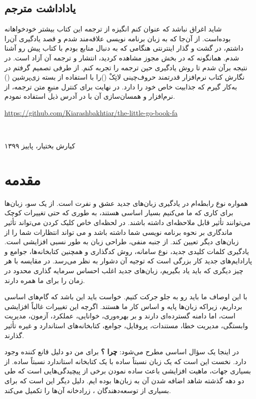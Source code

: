 \documentclass{book}
\begin{document}
\section{یاداداشت مترجم}
شاید اغراق نباشد که عنوان کنم انگیزه از ترجمه این کتاب بیشتر خودخواهانه بوده‌است. از آن‌جا که به زبان برنامه نویسی  علاقه‌مند شدم و قصد یادگیری آن‌را داشتم، در گشت و گذار اینترنتی هنگامی که به دنبال منابع بودم  با کتاب پیش رو آشنا شدم. همانگونه که در بخش مجوز مشاهده کردید، انتشار و ترجمه آن آزاد است. در نتیجه برآن شدم تا روش یادگیری حین ترجمه را تجربه کنم. از طرفی تصمیم گرفتم در نگارش کتاب نرم‌افزار قدرتمند حروف‌چینی لاتِکْ (\lr{\LaTeX})را با استفاده از بسته زی‌پرشین  (\lr{\XePersian}) به‌کار گیرم که جذابیت خاص خود را دارد. در نهایت برای کنترل منبعِ متن ترجمه، از نرم‌افزار  و همسان‌سازی آن با  در آدرس ذیل استفاده نمودم.
\begin{latin}
	\url{https://github.com/Kiarashbakhtiar/the-little-go-book-fa}
\end{latin}
\
\begin{flushleft}
	کیارش بختیار، پاییز ۱۳۹۹
	
\end{flushleft}


\chapter{ مقدمه }%
همواره نوع رابطه‌ام در یادگیری زبان‌های جدید عشق و نفرت است. از یک سو، زبان‌ها برای کاری که ما می‌کنیم بسیار اساسی هستند، به طوری که حتی تغییرات کوچک می‌توانند تأثیر قابل ملاحظه‌ای داشته باشند. در لحظه‌ای خاص کلیک کردن می‌تواند تأثیر ماندگاری بر نحوه برنامه نویسی شما داشته باشد و می تواند انتظارات شما را از زبان‌های دیگر تعیین کند. از جنبه منفی، طراحی زبان به طور نسبی افزایشی است. یادگیری کلمات کلیدی جدید، نوع سامانه، روش کدگذاری و همچنین کتابخانه‌ها، جوامع و پارادایم‌های جدید کار بزرگی است که توجیه آن دشوار به نظر می‌رسد. در مقایسه با هر چیز دیگری که باید یاد بگیریم، زبان‌های جدید اغلب احساس سرمایه گذاری محدود در زمان را برای ما همره دارند. 

با این اوصاف ما باید رو به جلو جرکت کنیم. خواست باید این باشد که گام‌های اساسی برداریم، زیراکه زبان‌ها پایه و اساس کار ما هستند. اگرچه این تغییرات غالباً افزایشی است، اما دامنه گسترده‌ای دارند و بر بهره‌وری، خوانایی، عملکرد، آزمون، مدیریت وابستگی، مدیریت خطا، مستندات، پروفایل، جوامع، کتابخانه‌های استاندارد و غیره تأثیر گذارند.

در اینجا یک سؤال اساسی مطرح می‌شود: \textbf{چرا  ؟} برای من دو دلیل قانع کننده وجود دارد. نخست این است که
یک زبان نسبتاً ساده با یک کتابخانه استاندارد نسبتاً ساده. از بسیاری جهات، ماهیت افزایشی \lr{Go} باعث ساده نمودن برخی از پیچیدگی‌هایی است که طی دو دهه گذشته شاهد اضافه شدن آن به زبان‌ها بوده ایم. دلیل دیگر این است که برای بسیاری از توسعه‌دهندگان ، زرادخانه آن‌ها را تکمیل می‌کند. 
\end{document}

